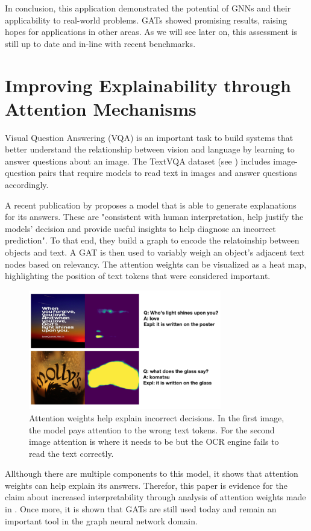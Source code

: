 In conclusion, this application demonstrated the potential of GNNs and their applicability to real-world problems. GATs showed promising results, raising hopes for applications in other areas. As we will see later on, this assessment is still up to date and in-line with recent benchmarks.\bigskip

\section*{Improving Explainability through Attention Mechanisms}

Visual Question Answering (VQA) is an important task to build systems that better understand the relationship between vision and language by learning to answer questions about an image. The TextVQA dataset (see \cite{singh2019vqa}) includes image-question pairs that require models to read text in images and answer questions accordingly.

A recent publication by \cite{rao2021look} proposes a model that is able to generate explanations for its answers. These are "consistent with human interpretation, help justify the models' decision and provide useful insights to help diagnose an incorrect prediction". To that end, they build a graph to encode the relatoinship between objects and text. A GAT is then used to variably weigh an object's adjacent text nodes based on relevancy. The attention weights can be visualized as a heat map, highlighting the position of text tokens that were considered important.\medskip

\begin{figure}[h]
    \centering
    \includegraphics[width=0.75\textwidth]{img/text_3.PNG}
    \caption{Attention weights help explain incorrect decisions. In the first image, the model pays attention to the wrong text tokens. For the second image attention is where it needs to be but the OCR engine fails to read the text correctly. \cite{rao2021look}}
    \medskip
\end{figure}

Allthough there are multiple components to this model, it shows that attention weights can help explain its answers. Therefor, this paper is evidence for the claim about increased interpretability through analysis of attention weights made in \cite{velickovic2018graph}. Once more, it is shown that GATs are still used today and remain an important tool in the graph neural network domain. \bigskip